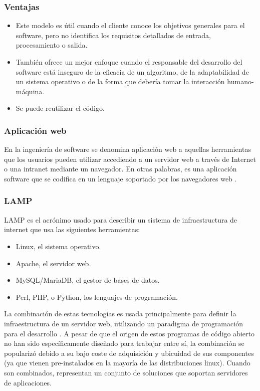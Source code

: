 \subsubsection{Ventajas}

\begin{itemize}
	\item Este modelo es útil cuando el cliente conoce los objetivos generales para el software, pero no identifica los requisitos detallados de entrada, procesamiento o salida.
	\item También ofrece un mejor enfoque cuando el responsable del desarrollo del software está inseguro de la eficacia de un algoritmo, de la adaptabilidad de un sistema operativo o de la forma que debería tomar la interacción humano-máquina.
	\item Se puede reutilizar el código.
\end{itemize}

\subsubsection{Aplicación web}
En la ingeniería de software se denomina aplicación web a aquellas herramientas que los usuarios pueden utilizar accediendo a un servidor web a través de Internet o una intranet mediante un navegador. En otras palabras, es una aplicación software que se codifica en un lenguaje soportado por los navegadores web \citep{mora}.

\subsubsection{LAMP}

LAMP es el acrónimo usado para describir un sistema de infraestructura de internet que usa las siguientes herramientas:

\begin{itemize}
	\item Linux, el sistema operativo.
	\item Apache, el servidor web.
	\item MySQL/MariaDB, el gestor de bases de datos.
	\item Perl, PHP, o Python, los lenguajes de programación. 
\end{itemize}

La combinación de estas tecnologías es usada principalmente para definir la infraestructura de un servidor web, utilizando un paradigma de programación para el desarrollo \citep{apache}.
\vskip 0.3cm
A pesar de que el origen de estos programas de código abierto no han sido específicamente diseñado para trabajar entre sí, la combinación se popularizó debido a su bajo coste de adquisición y ubicuidad de sus componentes (ya que vienen pre-instalados en la mayoría de las distribuciones linux). Cuando son combinados, representan un conjunto de soluciones que soportan servidores de aplicaciones.

